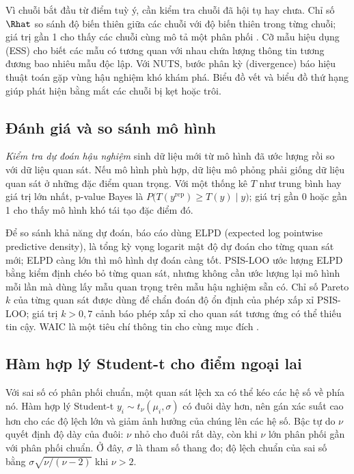 \documentclass[12pt,a4paper]{report}
\begin{document}
Vì chuỗi bắt đầu từ điểm tuỳ ý, cần kiểm tra chuỗi đã hội tụ hay chưa. Chỉ số
$\Rhat$ so sánh độ biến thiên giữa các chuỗi với độ biến thiên trong từng chuỗi; giá trị
gần 1 cho thấy các chuỗi cùng mô tả một phân phối \cite{vehtari2021rhat}. Cỡ mẫu
hiệu dụng (ESS) cho biết các mẫu có tương quan với nhau chứa lượng thông tin
tương đương bao nhiêu mẫu độc lập. Với NUTS, bước phân kỳ (divergence) báo hiệu
thuật toán gặp vùng hậu nghiệm khó khám phá. Biểu đồ vết và biểu đồ thứ hạng
giúp phát hiện bằng mắt các chuỗi bị kẹt hoặc trôi.

\subsection{Đánh giá và so sánh mô hình}

\emph{Kiểm tra dự đoán hậu nghiệm} sinh dữ liệu mới từ mô hình đã ước lượng rồi
so với dữ liệu quan sát. Nếu mô hình phù hợp, dữ liệu mô phỏng phải giống dữ liệu
quan sát ở những đặc điểm quan trọng. Với một thống kê $T$ như trung bình hay giá trị
lớn nhất, p-value Bayes là $P\bigl(T(y^{\text{rep}}) \ge T(y) \mid y\bigr)$;
giá trị gần 0 hoặc gần 1 cho thấy mô hình khó tái tạo đặc điểm đó.

Để so sánh khả năng dự đoán, báo cáo dùng ELPD (expected log pointwise
predictive density), là tổng kỳ vọng logarit mật độ dự đoán cho từng quan sát
mới; ELPD càng lớn thì mô hình dự đoán càng tốt. PSIS-LOO ước lượng ELPD bằng
kiểm định chéo bỏ từng quan sát, nhưng không cần ước lượng lại mô hình mỗi lần
mà dùng lấy mẫu quan trọng trên mẫu hậu nghiệm sẵn có. Chỉ số Pareto $k$ của
từng quan sát được dùng để chẩn đoán độ ổn định của phép xấp xỉ PSIS-LOO;
giá trị $k > 0{,}7$ cảnh báo phép xấp xỉ cho quan sát tương ứng có thể thiếu
tin cậy. WAIC là một tiêu
chí thông tin cho cùng mục đích \cite{vehtari2017loo}.

\subsection{Hàm hợp lý Student-t cho điểm ngoại lai}

Với sai số có phân phối chuẩn, một quan sát lệch xa có thể kéo các hệ số về phía nó. Hàm hợp
lý Student-t $y_i \sim t_\nu(\mu_i, \sigma)$ có đuôi dày hơn, nên gán xác suất
cao hơn cho các độ lệch lớn và giảm ảnh hưởng của chúng lên các hệ số. Bậc tự do $\nu$ quyết
định độ dày của đuôi: $\nu$ nhỏ cho đuôi rất dày, còn khi $\nu$ lớn phân phối
gần với phân phối chuẩn. Ở đây, $\sigma$ là tham số thang đo; độ lệch chuẩn của
sai số bằng $\sigma\sqrt{\nu/(\nu-2)}$ khi $\nu > 2$.
\end{document}
